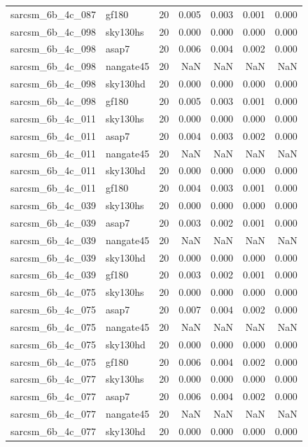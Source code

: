\begin{tabular}{llrrrrr}
sarcsm\_6b\_4c\_087 & gf180 & 20 & 0.005 & 0.003 & 0.001 & 0.000 \\
sarcsm\_6b\_4c\_098 & sky130hs & 20 & 0.000 & 0.000 & 0.000 & 0.000 \\
sarcsm\_6b\_4c\_098 & asap7 & 20 & 0.006 & 0.004 & 0.002 & 0.000 \\
sarcsm\_6b\_4c\_098 & nangate45 & 20 & NaN & NaN & NaN & NaN \\
sarcsm\_6b\_4c\_098 & sky130hd & 20 & 0.000 & 0.000 & 0.000 & 0.000 \\
sarcsm\_6b\_4c\_098 & gf180 & 20 & 0.005 & 0.003 & 0.001 & 0.000 \\
sarcsm\_6b\_4c\_011 & sky130hs & 20 & 0.000 & 0.000 & 0.000 & 0.000 \\
sarcsm\_6b\_4c\_011 & asap7 & 20 & 0.004 & 0.003 & 0.002 & 0.000 \\
sarcsm\_6b\_4c\_011 & nangate45 & 20 & NaN & NaN & NaN & NaN \\
sarcsm\_6b\_4c\_011 & sky130hd & 20 & 0.000 & 0.000 & 0.000 & 0.000 \\
sarcsm\_6b\_4c\_011 & gf180 & 20 & 0.004 & 0.003 & 0.001 & 0.000 \\
sarcsm\_6b\_4c\_039 & sky130hs & 20 & 0.000 & 0.000 & 0.000 & 0.000 \\
sarcsm\_6b\_4c\_039 & asap7 & 20 & 0.003 & 0.002 & 0.001 & 0.000 \\
sarcsm\_6b\_4c\_039 & nangate45 & 20 & NaN & NaN & NaN & NaN \\
sarcsm\_6b\_4c\_039 & sky130hd & 20 & 0.000 & 0.000 & 0.000 & 0.000 \\
sarcsm\_6b\_4c\_039 & gf180 & 20 & 0.003 & 0.002 & 0.001 & 0.000 \\
sarcsm\_6b\_4c\_075 & sky130hs & 20 & 0.000 & 0.000 & 0.000 & 0.000 \\
sarcsm\_6b\_4c\_075 & asap7 & 20 & 0.007 & 0.004 & 0.002 & 0.000 \\
sarcsm\_6b\_4c\_075 & nangate45 & 20 & NaN & NaN & NaN & NaN \\
sarcsm\_6b\_4c\_075 & sky130hd & 20 & 0.000 & 0.000 & 0.000 & 0.000 \\
sarcsm\_6b\_4c\_075 & gf180 & 20 & 0.006 & 0.004 & 0.002 & 0.000 \\
sarcsm\_6b\_4c\_077 & sky130hs & 20 & 0.000 & 0.000 & 0.000 & 0.000 \\
sarcsm\_6b\_4c\_077 & asap7 & 20 & 0.006 & 0.004 & 0.002 & 0.000 \\
sarcsm\_6b\_4c\_077 & nangate45 & 20 & NaN & NaN & NaN & NaN \\
sarcsm\_6b\_4c\_077 & sky130hd & 20 & 0.000 & 0.000 & 0.000 & 0.000 \\

\end{tabular}
